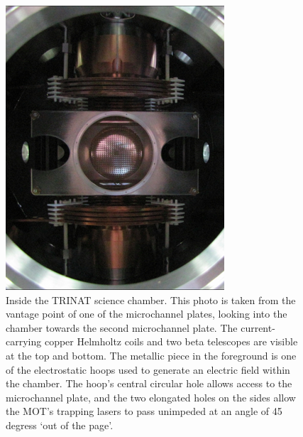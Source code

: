 \begin{figure}[h!b!t]
	\centering
	\includegraphics[width=.80\linewidth]{Figures/chamber_photo_2.png}
	\caption{Inside the TRINAT science chamber.  This photo is taken from the vantage point of one of the microchannel plates, looking into the chamber towards the second microchannel plate.  The current-carrying copper Helmholtz coils and two beta telescopes are visible at the top and bottom.  The metallic piece in the foreground is one of the electrostatic hoops used to generate an electric field within the chamber.  The hoop's central circular hole allows access to the microchannel plate, and the two elongated holes on the sides allow the MOT's trapping lasers to pass unimpeded at an angle of 45 degress `out of the page'.}
	\label{fig:thechamber}
\end{figure}

